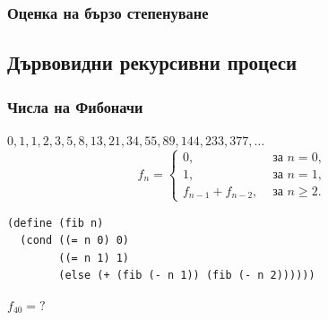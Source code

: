 \documentclass[alsotrans]{beamerswitch}
\begin{document}
\begin{frame}
  \frametitle{Оценка на бързо степенуване}

  \begin{center}
    \scriptsize
  \end{center}
  \vspace{-1ex}
\end{frame}

\subsection{Дървовидни рекурсивни процеси}

\begin{frame}[fragile]
  \frametitle{Числа на Фибоначи}

  $0, 1, 1, 2, 3, 5, 8, 13, 21, 34, 55, 89, 144, 233, 377, \ldots$\\
  \pause
  \begin{equation*}
    f_n =
    \begin{cases}
      0, &\text{ за }n = 0,\\
      1, &\text{ за }n = 1,\\
      f_{n-1} + f_{n-2}, &\text{ за }n \geq 2.
    \end{cases}
  \end{equation*}
  \pause
\begin{lstlisting}
(define (fib n)
  (cond ((= n 0) 0)
        ((= n 1) 1)
        (else (+ (fib (- n 1)) (fib (- n 2))))))
\end{lstlisting}
  \pause
  $f_{40} = ?$
\end{frame}
\end{document}
